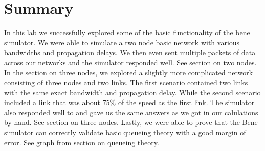 \documentclass[fleqn,11pt]{article}
\begin{document}
\section{Summary}
In this lab we successfully explored some of the basic functionality of the bene simulator. We were able to simulate a two node basic network with various bandwidths and propagation delays. We then even sent multiple packets of data across our networks and the simulator responded well. See section on two nodes. 
\newline
\newline
In the section on three nodes, we explored a slightly more complicated network consisting of three nodes and two links. The first scenario contained two links with the same exact bandwidth and propagation delay. While the second scenario included a link that was about 75\% of the speed as the first link. The simulator also responded well to and gave us the same answers as we got in our calulations by hand. See section on three nodes.
\newline
Lastly, we were able to prove that the Bene simulator can correctly validate basic queueing theory with a good margin of error. See graph from section on queueing theory. 
\end{document}
